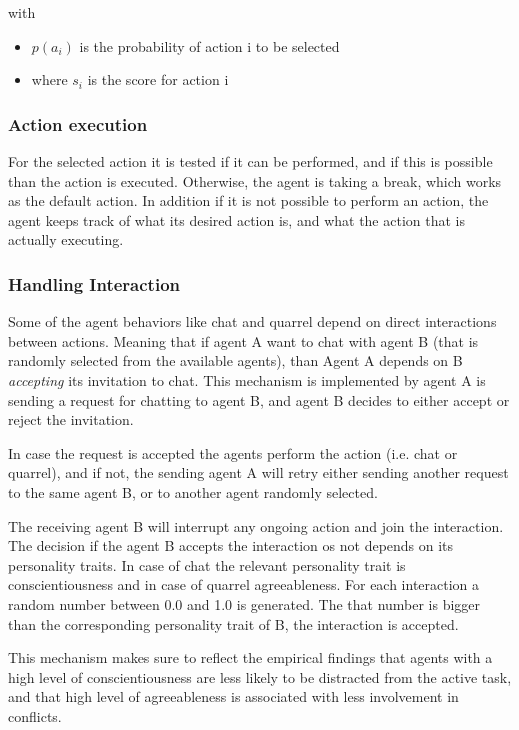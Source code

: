 with
\begin{itemize}
    \item $p(a_i)$ is the probability of action i to be selected
    \item where $s_i$ is the score for action i
\end{itemize}


\subsubsection{Action execution}
For the selected action it is tested if it can be performed, and if this is possible
than the action is executed. Otherwise, the agent is taking a break, which works
as the default action. In addition if it is not possible to perform an action, the
agent keeps track of what its desired action is, and what the action that is actually
executing. 

\subsubsection{Handling Interaction}
Some of the agent behaviors like chat and quarrel depend on direct interactions
between actions. Meaning that if agent A want to chat with agent B (that is
randomly selected from the available agents), than Agent A depends on B
\textit{accepting} its invitation to chat. This mechanism is implemented
by agent A is sending a request for chatting to agent B, and agent B decides to
either accept or reject the invitation. 

In case the request is accepted the agents perform the action (i.e. chat or quarrel),
and if not, the sending agent A will retry either sending another request to the
same agent B, or to another agent randomly selected.

\bb

The receiving agent B will interrupt any ongoing action and join the interaction.
The decision if the agent B accepts the interaction os not depends on its personality
traits. In case of chat the relevant personality trait is conscientiousness and
in case of quarrel agreeableness. For each interaction a random number between
0.0 and 1.0 is generated. The that number is bigger than the corresponding personality
trait of B, the interaction is accepted.

This mechanism makes sure to reflect the empirical findings that agents with a high
level of conscientiousness are less likely to be distracted from the active task,
and that high level of agreeableness is associated with less involvement in conflicts.


